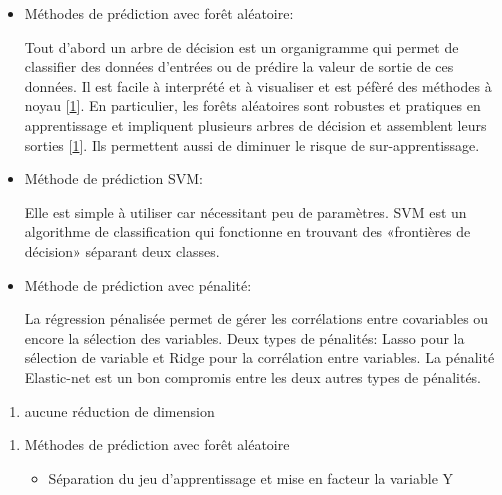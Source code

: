 \documentclass[
  12pt,
]{article}
\providecommand{\tightlist}{%
  \setlength{\itemsep}{0pt}\setlength{\parskip}{0pt}}
\begin{document}
\begin{itemize}
\item
  Méthodes de prédiction avec forêt aléatoire:

  Tout d'abord un arbre de décision est un organigramme qui permet de
  classifier des données d'entrées ou de prédire la valeur de sortie de
  ces données. Il est facile à interprété et à visualiser et est péfèré
  des méthodes à noyau {[}\protect\hyperlink{ref-Chollet2022}{1}{]}. En
  particulier, les forêts aléatoires sont robustes et pratiques en
  apprentissage et impliquent plusieurs arbres de décision et assemblent
  leurs sorties {[}\protect\hyperlink{ref-Chollet2022}{1}{]}. Ils
  permettent aussi de diminuer le risque de sur-apprentissage.
\item
  Méthode de prédiction SVM:

  Elle est simple à utiliser car nécessitant peu de paramètres. SVM est
  un algorithme de classification qui fonctionne en trouvant des
  «frontières de décision» séparant deux classes.
\item
  Méthode de prédiction avec pénalité:

  La régression pénalisée permet de gérer les corrélations entre
  covariables ou encore la sélection des variables. Deux types de
  pénalités: Lasso pour la sélection de variable et Ridge pour la
  corrélation entre variables. La pénalité Elastic-net est un bon
  compromis entre les deux autres types de pénalités.
\end{itemize}

\begin{enumerate}
\def\labelenumi{\alph{enumi}.}
\tightlist
\item
  aucune réduction de dimension
\end{enumerate}

\begin{enumerate}
\def\labelenumi{\arabic{enumi}.}
\item
  Méthodes de prédiction avec forêt aléatoire

  \begin{itemize}
  \tightlist
  \item
    Séparation du jeu d'apprentissage et mise en facteur la variable Y
  \end{itemize}
\end{enumerate}
\end{document}
